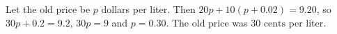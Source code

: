 Let the old price be $p$ dollars per liter. Then $20p+10(p+0.02)=9.20$, so $30p+0.2=9.2$, $30p=9$ and $p=0.30$. The old price was $\boxed{30\text{ cents}}$ per liter.

